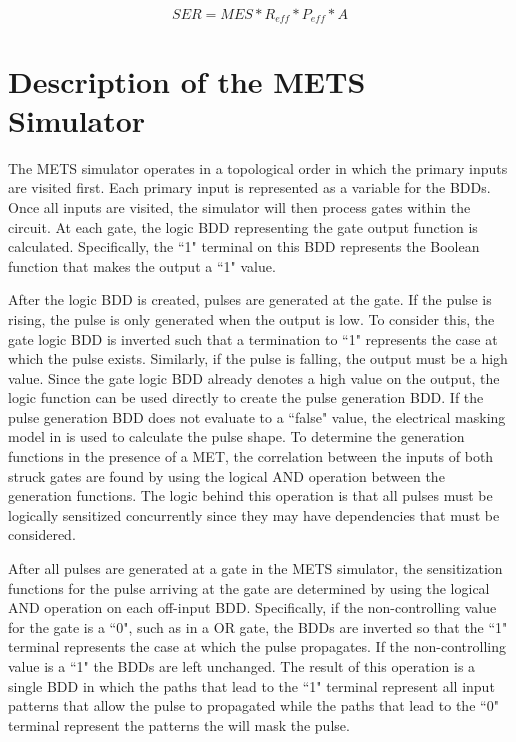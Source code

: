 \documentclass[conference]{IEEEtran}
\begin{document}
\small
\begin{equation} \label{SER}
SER = MES*R_{eff}*P_{eff}*A 
\end{equation}
\normalsize

\section{Description of the METS Simulator} \label{desc}

The METS simulator operates in a topological order in which the primary inputs are visited first. Each primary input is represented as a variable for the BDDs. Once all inputs are visited, the simulator will then process gates within the circuit. At each gate, the logic BDD representing the gate output function is calculated. Specifically, the ``1" terminal on this BDD represents the Boolean function that makes the output a ``1" value.

After the logic BDD is created, pulses are generated at the gate. If the pulse is rising, the pulse is only generated when the output is low. To consider this, the gate logic BDD is inverted such that a termination to ``1" represents the case at which the pulse exists. Similarly, if the pulse is falling, the output must be a high value. Since the gate logic BDD already denotes a high value on the output, the logic function can be used directly to create the pulse generation BDD. If the pulse generation BDD does not evaluate to a ``false" value, the electrical masking model in \cite{Watkins2016} is used to calculate the pulse shape. To determine the generation functions in the presence of a MET, the correlation between the inputs of both struck gates are found by using the logical AND operation between the generation functions. The logic behind this operation is that all pulses must be logically sensitized concurrently since they may have dependencies that must be considered. 

After all pulses are generated at a gate in the METS simulator, the sensitization functions for the pulse arriving at the gate are determined by using the logical AND operation on each off-input BDD. Specifically, if the non-controlling value for the gate is a ``0", such as in a OR gate, the BDDs are inverted so that the ``1" terminal represents the case at which the pulse propagates. If the non-controlling value is a ``1" the BDDs are left unchanged. The result of this operation is a single BDD in which the paths that lead to the ``1" terminal represent all input patterns that allow the pulse to propagated while the paths that lead to the ``0" terminal represent the patterns the will mask the pulse.
\end{document}
